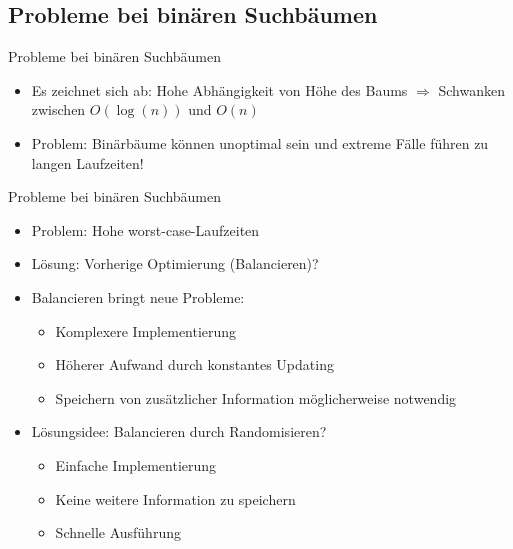 \documentclass[t]{beamer}
\theoremstyle{plain}
\begin{document}
\subsection{Probleme bei binären Suchbäumen}
    \begin{frame}{Probleme bei binären Suchbäumen}
    \begin{itemize}
    \item Es zeichnet sich ab: Hohe Abhängigkeit von Höhe des Baums $\Rightarrow$ Schwanken zwischen $O(\log(n))$ und $O(n)$
    \item Problem: Binärbäume können unoptimal sein und extreme Fälle führen zu langen Laufzeiten!
    \end{itemize}
    {}
\end{frame}

\begin{frame}{Probleme bei binären Suchbäumen}
    \begin{itemize}
    \item Problem: Hohe worst-case-Laufzeiten
    \item Lösung: Vorherige Optimierung (Balancieren)?
    \item Balancieren bringt neue Probleme:
        \begin{itemize}
        \item Komplexere Implementierung
        \item Höherer Aufwand durch konstantes Updating
        \item Speichern von zusätzlicher Information möglicherweise notwendig
        \end{itemize}
    \bigskip
    \item Lösungsidee: Balancieren durch Randomisieren?
    \begin{itemize}
        \item Einfache Implementierung
        \item Keine weitere Information zu speichern
        \item Schnelle Ausführung
    \end{itemize}
\end{itemize}
\end{frame}
\end{document}
